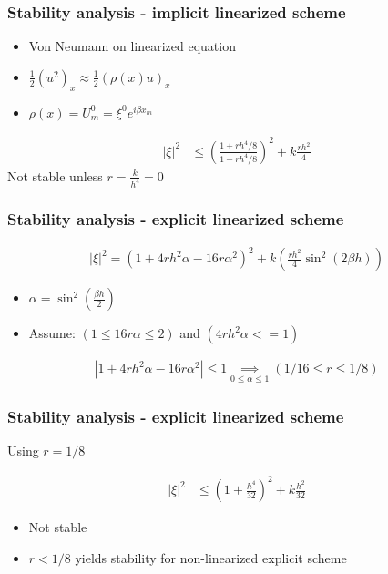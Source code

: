\documentclass[screen]{beamer}
\begin{document}
\begin{frame}

\frametitle{Stability analysis - implicit linearized scheme}
\begin{itemize}
\item Von Neumann on linearized equation \\
\item $\frac{1}{2}(u^2)_x \approx \frac{1}{2}(\rho(x)u)_x$ \\
\item $\rho(x) = U^0_m = \xi^0 e^{i\beta x_m}$ 
\end{itemize}


\begin{align*}
|\xi |^2 &\le \left(\frac{1+rh^4/8}{1-rh^4/8}\right)^2 + k\frac{rh^2}{4}
\end{align*}
Not stable unless $r = \frac{k}{h^4}= 0$

\end{frame}


\begin{frame}
\frametitle{Stability analysis - explicit linearized scheme}
\begin{align*}
|\xi |^2 =  \left(1+4rh^2\alpha-16r\alpha^2\right)^2 + k\left(\frac{rh^2}{4}\sin^2(2\beta h)\right)
\end{align*}

\begin{itemize}
\item $\alpha = \sin^2(\frac{\beta h}{2})$
\item Assume: $(1 \le 16r\alpha \le 2)$ and $(4rh^2\alpha <= 1)$
\end{itemize}

\begin{align*}
 \left| 1+4rh^2\alpha -16r\alpha^2\right| \le 1 \underset{0\le \alpha\le 1}{\implies} \left(1/16 \le r \le 1/8 \right)
\end{align*} 

\end{frame}

\begin{frame}
\frametitle{Stability analysis - explicit linearized scheme}

Using $r = 1/8$ 

\begin{align*}
|\xi |^2 &\le \left(1 + \frac{h^4}{32}\right)^2 + k\frac{h^2}{32} 
\end{align*}

\begin{itemize}
\item Not stable
\item $r < 1/8$ yields stability for non-linearized explicit scheme
\end{itemize}
\end{frame}
\end{document}
